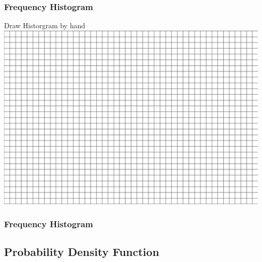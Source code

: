 \documentclass[fleqn]{beamer} %
\newcommand{\sectionIsubsectionIIItitle}{Frequency Histogram}
\newcommand{\sectionIsubsectionIVtitle}{Probability Density Function}
\begin{document}
			\begin{frame} 
				\frametitle{\sectionIsubsectionIIItitle}
				\bigskip
				\scriptsize Draw Historgram by hand 
				\includegraphics[scale=.20]{images/graph_paper_80_30.png}		


			\end{frame}

			\begin{frame} 
				\frametitle{\sectionIsubsectionIIItitle}
				\bigskip

	

			\end{frame}



		\subsection{\sectionIsubsectionIVtitle}\label{sectionIsubsectionIV}	
\end{document}
